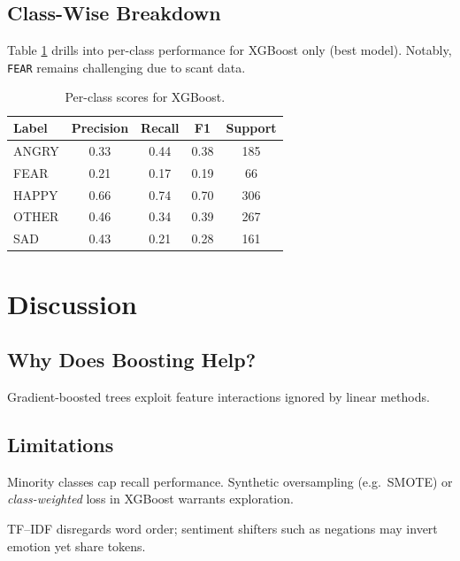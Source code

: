 \documentclass[12pt]{article}
\begin{document}
\subsection{Class-Wise Breakdown}
Table \ref{tab:detailed} drills into per-class performance for XGBoost only (best model).
Notably, \texttt{FEAR} remains challenging due to scant data.

\begin{table}[H]
\centering
\caption{Per-class scores for XGBoost.\label{tab:detailed}}
\begin{tabular}{lcccc}
\toprule
\textbf{Label} & \textbf{Precision} & \textbf{Recall} & \textbf{F1} & \textbf{Support}\\
\midrule
ANGRY & 0.33 & 0.44 & 0.38 & 185\\
FEAR  & 0.21 & 0.17 & 0.19 &  66\\
HAPPY & 0.66 & 0.74 & 0.70 & 306\\
OTHER & 0.46 & 0.34 & 0.39 & 267\\
SAD   & 0.43 & 0.21 & 0.28 & 161\\
\bottomrule
\end{tabular}
\end{table}

\section{Discussion}
\label{sec:discussion}

\subsection{Why Does Boosting Help?}
Gradient-boosted trees exploit feature interactions ignored by linear methods.

\subsection{Limitations}
\begin{description}[leftmargin=0pt]
  \item[Imbalanced Data.] Minority classes cap recall performance.
    Synthetic oversampling (e.g.\ SMOTE) or \emph{class-weighted} loss in XGBoost
    warrants exploration.
  \item[Sparse Features.] TF–IDF disregards word order; sentiment shifters
    such as negations may invert emotion yet share tokens.
\end{description}
\end{document}
